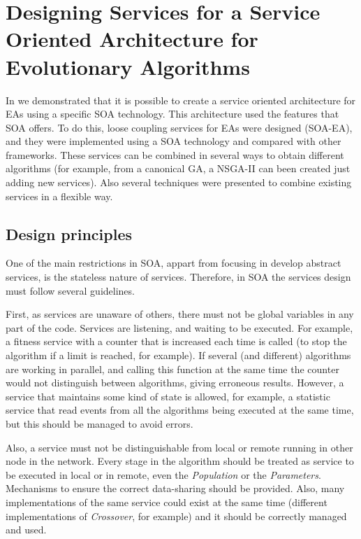 \documentclass{sig-alternate}
\begin{document}
\section{Designing Services for a Service Oriented Architecture for Evolutionary Algorithms}
\label{sec:design}

In \cite{OSGILIATH} we demonstrated that it is possible to create a service oriented architecture for EAs using a specific SOA technology. This architecture used the features that SOA offers. To do this, loose coupling services for EAs were designed (SOA-EA), and they were implemented using a SOA technology and compared with other frameworks. These services can be combined in several ways to obtain different algorithms (for example, from a canonical GA, a NSGA-II can been created just adding new services). Also several techniques were presented to combine existing services in a flexible way.



\subsection{Design principles}


One of the main restrictions in SOA, appart from focusing in develop abstract services, is the stateless nature of services. Therefore, in SOA the services design must follow several guidelines.

First, as services are unaware of others, there must not be global variables in any part of the code. Services are listening, and waiting to be executed. For example, a fitness service with a counter that is increased each time is called (to stop the algorithm if a limit is reached, for example). If several (and different) algorithms are working in parallel, and calling this function at the same time the counter would not distinguish between algorithms, giving erroneous results. However, a service that maintains some kind of state is allowed, for example, a statistic service that read events from all the algorithms being executed at the same time, but this should be managed to avoid errors.

Also, a service must not be distinguishable from local or remote running in other node in the network. Every stage in the algorithm should be treated as service to be executed in local or in remote, even the {\em Population} or the {\em Parameters}. Mechanisms to ensure the correct data-sharing should be provided. Also, many implementations of the same service could exist at the same time (different implementations of {\em Crossover}, for example) and it should be correctly managed and used.
\end{document}
